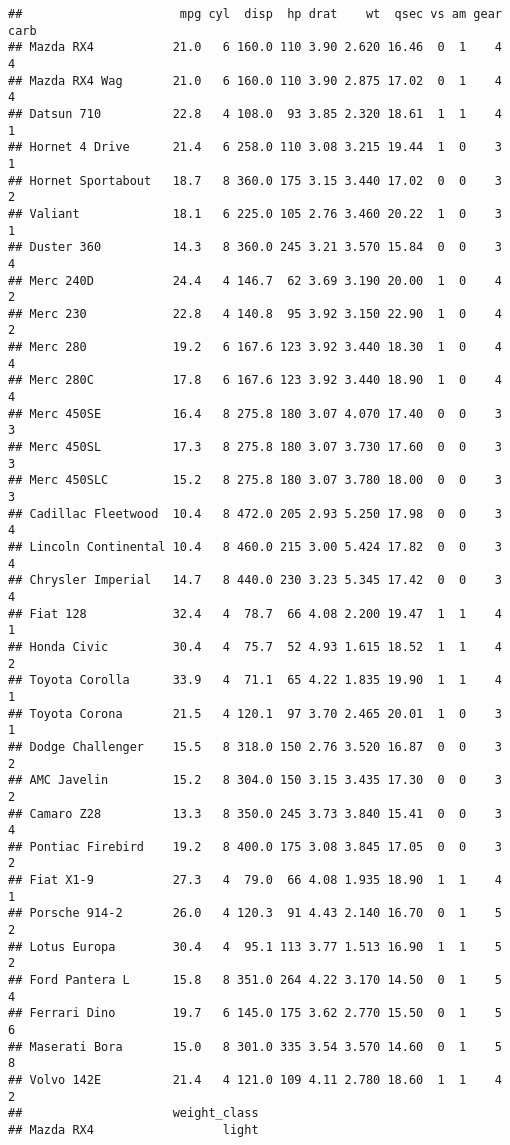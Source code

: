 \documentclass[]{article}
\begin{document}
\begin{verbatim}
##                      mpg cyl  disp  hp drat    wt  qsec vs am gear carb
## Mazda RX4           21.0   6 160.0 110 3.90 2.620 16.46  0  1    4    4
## Mazda RX4 Wag       21.0   6 160.0 110 3.90 2.875 17.02  0  1    4    4
## Datsun 710          22.8   4 108.0  93 3.85 2.320 18.61  1  1    4    1
## Hornet 4 Drive      21.4   6 258.0 110 3.08 3.215 19.44  1  0    3    1
## Hornet Sportabout   18.7   8 360.0 175 3.15 3.440 17.02  0  0    3    2
## Valiant             18.1   6 225.0 105 2.76 3.460 20.22  1  0    3    1
## Duster 360          14.3   8 360.0 245 3.21 3.570 15.84  0  0    3    4
## Merc 240D           24.4   4 146.7  62 3.69 3.190 20.00  1  0    4    2
## Merc 230            22.8   4 140.8  95 3.92 3.150 22.90  1  0    4    2
## Merc 280            19.2   6 167.6 123 3.92 3.440 18.30  1  0    4    4
## Merc 280C           17.8   6 167.6 123 3.92 3.440 18.90  1  0    4    4
## Merc 450SE          16.4   8 275.8 180 3.07 4.070 17.40  0  0    3    3
## Merc 450SL          17.3   8 275.8 180 3.07 3.730 17.60  0  0    3    3
## Merc 450SLC         15.2   8 275.8 180 3.07 3.780 18.00  0  0    3    3
## Cadillac Fleetwood  10.4   8 472.0 205 2.93 5.250 17.98  0  0    3    4
## Lincoln Continental 10.4   8 460.0 215 3.00 5.424 17.82  0  0    3    4
## Chrysler Imperial   14.7   8 440.0 230 3.23 5.345 17.42  0  0    3    4
## Fiat 128            32.4   4  78.7  66 4.08 2.200 19.47  1  1    4    1
## Honda Civic         30.4   4  75.7  52 4.93 1.615 18.52  1  1    4    2
## Toyota Corolla      33.9   4  71.1  65 4.22 1.835 19.90  1  1    4    1
## Toyota Corona       21.5   4 120.1  97 3.70 2.465 20.01  1  0    3    1
## Dodge Challenger    15.5   8 318.0 150 2.76 3.520 16.87  0  0    3    2
## AMC Javelin         15.2   8 304.0 150 3.15 3.435 17.30  0  0    3    2
## Camaro Z28          13.3   8 350.0 245 3.73 3.840 15.41  0  0    3    4
## Pontiac Firebird    19.2   8 400.0 175 3.08 3.845 17.05  0  0    3    2
## Fiat X1-9           27.3   4  79.0  66 4.08 1.935 18.90  1  1    4    1
## Porsche 914-2       26.0   4 120.3  91 4.43 2.140 16.70  0  1    5    2
## Lotus Europa        30.4   4  95.1 113 3.77 1.513 16.90  1  1    5    2
## Ford Pantera L      15.8   8 351.0 264 4.22 3.170 14.50  0  1    5    4
## Ferrari Dino        19.7   6 145.0 175 3.62 2.770 15.50  0  1    5    6
## Maserati Bora       15.0   8 301.0 335 3.54 3.570 14.60  0  1    5    8
## Volvo 142E          21.4   4 121.0 109 4.11 2.780 18.60  1  1    4    2
##                     weight_class
## Mazda RX4                  light

\end{verbatim}
\end{document}
